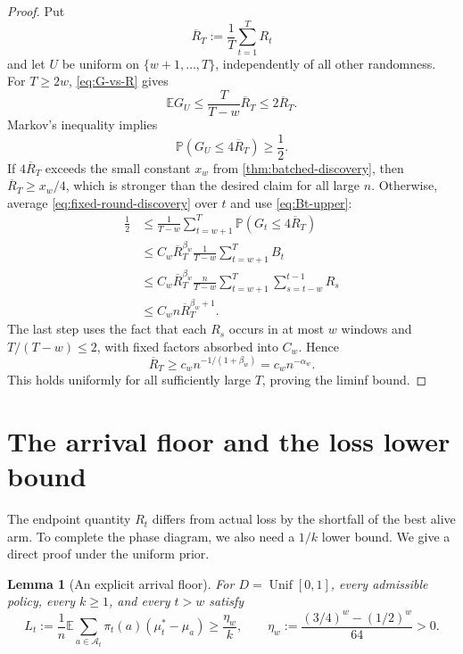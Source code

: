 \documentclass[11pt,letterpaper]{article}
\numberwithin{equation}{section}
\newtheorem{lemma}[lemma]{Lemma}
\theoremstyle{definition}
\theoremstyle{remark}
\newcommand{\E}{\mathbb{E}}
\newcommand{\Pp}{\mathbb{P}}
\newcommand{\1}{\mathbf{1}}
\newcommand{\A}{\mathcal{A}}
\newcommand{\Unif}{\operatorname{Unif}}
\begin{document}
\begin{proof}
Put
\[
  \overline R_T:=\frac1T\sum_{t=1}^{T}R_t
\]
and let $U$ be uniform on $\{w+1,\ldots,T\}$, independently of all other
randomness.  For $T\ge2w$, \cref{eq:G-vs-R} gives
\[
  \E G_U
  \le \frac{T}{T-w}\overline R_T
  \le2\overline R_T.
\]
Markov's inequality implies
\begin{equation}\label{eq:markov-good-arm}
  \Pp(G_U\le4\overline R_T)\ge\frac12.
\end{equation}
If $4\overline R_T$ exceeds the small constant $x_w$ from
\cref{thm:batched-discovery}, then
$\overline R_T\ge x_w/4$, which is stronger than the desired claim for all
large $n$.  Otherwise, average \cref{eq:fixed-round-discovery} over $t$ and use
\cref{eq:Bt-upper}:
\begin{align*}
  \frac12
  &\le \frac1{T-w}\sum_{t=w+1}^{T}
        \Pp(G_t\le4\overline R_T) \\
  &\le C_w\overline R_T^{\beta_w}
        \frac1{T-w}\sum_{t=w+1}^{T}B_t \\
  &\le C_w\overline R_T^{\beta_w}
        \frac{n}{T-w}
        \sum_{t=w+1}^{T}\sum_{s=t-w}^{t-1}R_s \\
  &\le C_w n\overline R_T^{\beta_w+1}.
\end{align*}
The last step uses the fact that each $R_s$ occurs in at most $w$ windows and
$T/(T-w)\le2$, with fixed factors absorbed into $C_w$.  Hence
\[
  \overline R_T
  \ge c_w n^{-1/(1+\beta_w)}
  =c_w n^{-\alpha_w}.
\]
This holds uniformly for all sufficiently large $T$, proving the liminf bound.
\end{proof}

\section{The arrival floor and the loss lower bound}\label{sec:arrival-floor}

The endpoint quantity $R_t$ differs from actual loss by the shortfall of the
best alive arm.  To complete the phase diagram, we also need a $1/k$ lower bound.
We give a direct proof under the uniform prior.

\begin{lemma}[An explicit arrival floor]\label{lem:arrival-floor}
For $D=\Unif[0,1]$, every admissible policy, every $k\ge1$, and
every $t>w$ satisfy
\begin{equation}\label{eq:arrival-floor}
  L_t:=\frac1n\E\sum_{a\in\A_t}
       \pi_t(a)(\mu_t^*-\mu_a)
  \ge \frac{\eta_w}{k},
  \qquad
  \eta_w:=\frac{(3/4)^w-(1/2)^w}{64}>0.
\end{equation}
\end{lemma}
\end{document}
